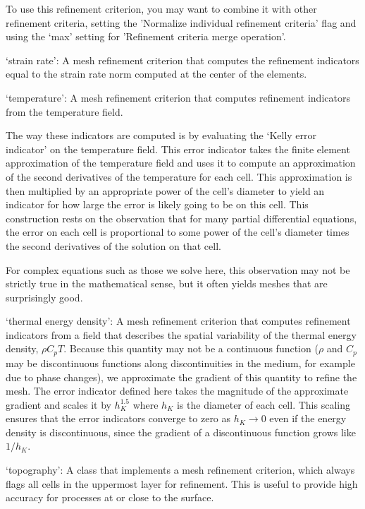 \begin{itemize}
To use this refinement criterion, you may want to combine it with other refinement criteria, setting the 'Normalize individual refinement criteria' flag and using the `max' setting for 'Refinement criteria merge operation'.

`strain rate': A mesh refinement criterion that computes the refinement indicators equal to the strain rate norm computed at the center of the elements.

`temperature': A mesh refinement criterion that computes refinement indicators from the temperature field.

The way these indicators are computed is by evaluating the `Kelly error indicator' on the temperature field. This error indicator takes the finite element approximation of the temperature field and uses it to compute an approximation of the second derivatives of the temperature for each cell. This approximation is then multiplied by an appropriate power of the cell's diameter to yield an indicator for how large the error is likely going to be on this cell. This construction rests on the observation that for many partial differential equations, the error on each cell is proportional to some power of the cell's diameter times the second derivatives of the solution on that cell.

For complex equations such as those we solve here, this observation may not be strictly true in the mathematical sense, but it often yields meshes that are surprisingly good.

`thermal energy density': A mesh refinement criterion that computes refinement indicators from a field that describes the spatial variability of the thermal energy density, $\rho C_p T$. Because this quantity may not be a continuous function ($\rho$ and $C_p$ may be discontinuous functions along discontinuities in the medium, for example due to phase changes), we approximate the gradient of this quantity to refine the mesh. The error indicator defined here takes the magnitude of the approximate gradient and scales it by $h_K^{1.5}$ where $h_K$ is the diameter of each cell. This scaling ensures that the error indicators converge to zero as $h_K\rightarrow 0$ even if the energy density is discontinuous, since the gradient of a discontinuous function grows like $1/h_K$.

`topography': A class that implements a mesh refinement criterion, which always flags all cells in the uppermost layer for refinement. This is useful to provide high accuracy for processes at or close to the surface.


\end{itemize}
